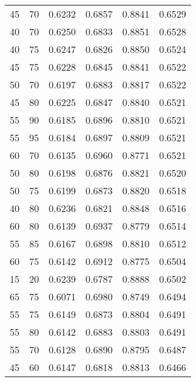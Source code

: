 \begin{center}
\begin{longtable}{|l|l|l|l|l|l|}
45                & 70                & 0.6232    & 0.6857 & 0.8841      & 0.6529    \\
40                & 70                & 0.6250    & 0.6833 & 0.8851      & 0.6528    \\
40                & 75                & 0.6247    & 0.6826 & 0.8850      & 0.6524    \\
45                & 75                & 0.6228    & 0.6845 & 0.8841      & 0.6522    \\
50                & 70                & 0.6197    & 0.6883 & 0.8817      & 0.6522    \\
45                & 80                & 0.6225    & 0.6847 & 0.8840      & 0.6521    \\
55                & 90                & 0.6185    & 0.6896 & 0.8810      & 0.6521    \\
55                & 95                & 0.6184    & 0.6897 & 0.8809      & 0.6521    \\
60                & 70                & 0.6135    & 0.6960 & 0.8771      & 0.6521    \\
50                & 80                & 0.6198    & 0.6876 & 0.8821      & 0.6520    \\
50                & 75                & 0.6199    & 0.6873 & 0.8820      & 0.6518    \\
40                & 80                & 0.6236    & 0.6821 & 0.8848      & 0.6516    \\
60                & 80                & 0.6139    & 0.6937 & 0.8779      & 0.6514    \\
55                & 85                & 0.6167    & 0.6898 & 0.8810      & 0.6512    \\
60                & 75                & 0.6142    & 0.6912 & 0.8775      & 0.6504    \\
15                & 20                & 0.6239    & 0.6787 & 0.8888      & 0.6502    \\
65                & 75                & 0.6071    & 0.6980 & 0.8749      & 0.6494    \\
55                & 75                & 0.6149    & 0.6873 & 0.8804      & 0.6491    \\
55                & 80                & 0.6142    & 0.6883 & 0.8803      & 0.6491    \\
55                & 70                & 0.6128    & 0.6890 & 0.8795      & 0.6487    \\
45                & 60                & 0.6147    & 0.6818 & 0.8813      & 0.6466    \\

\end{longtable}
\end{center}
